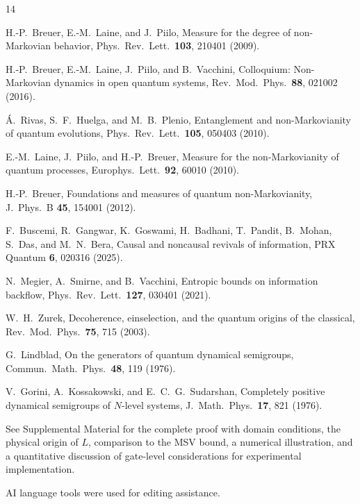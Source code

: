 \documentclass[aps,prl,twocolumn,superscriptaddress,hyperref]{revtex4-2}
\begin{document}
\begin{thebibliography}{14}

H.-P.~Breuer, E.-M.~Laine, and J.~Piilo,
Measure for the degree of non-Markovian behavior,
Phys.\ Rev.\ Lett.\ \textbf{103}, 210401 (2009).

H.-P.~Breuer, E.-M.~Laine, J.~Piilo, and B.~Vacchini,
Colloquium: Non-Markovian dynamics in open quantum systems,
Rev.\ Mod.\ Phys.\ \textbf{88}, 021002 (2016).

\'A.~Rivas, S.~F.~Huelga, and M.~B.~Plenio,
Entanglement and non-Markovianity of quantum evolutions,
Phys.\ Rev.\ Lett.\ \textbf{105}, 050403 (2010).

E.-M.~Laine, J.~Piilo, and H.-P.~Breuer,
Measure for the non-Markovianity of quantum processes,
Europhys.\ Lett.\ \textbf{92}, 60010 (2010).

H.-P.~Breuer,
Foundations and measures of quantum non-Markovianity,
J.\ Phys.\ B \textbf{45}, 154001 (2012).

F.~Buscemi, R.~Gangwar, K.~Goswami, H.~Badhani, T.~Pandit, B.~Mohan, S.~Das, and M.~N.~Bera,
Causal and noncausal revivals of information,
PRX Quantum \textbf{6}, 020316 (2025).

N.~Megier, A.~Smirne, and B.~Vacchini,
Entropic bounds on information backflow,
Phys.\ Rev.\ Lett.\ \textbf{127}, 030401 (2021).

W.~H.~Zurek,
Decoherence, einselection, and the quantum origins of the classical,
Rev.\ Mod.\ Phys.\ \textbf{75}, 715 (2003).

G.~Lindblad,
On the generators of quantum dynamical semigroups,
Commun.\ Math.\ Phys.\ \textbf{48}, 119 (1976).

V.~Gorini, A.~Kossakowski, and E.~C.~G.~Sudarshan,
Completely positive dynamical semigroups of $N$-level systems,
J.\ Math.\ Phys.\ \textbf{17}, 821 (1976).

See Supplemental Material for the complete proof with domain conditions, the physical origin of $L$, comparison to the MSV bound, a numerical illustration, and a quantitative discussion of gate-level considerations for experimental implementation.

\end{thebibliography}

\acknowledgments
AI language tools were used for editing assistance.
\end{document}
